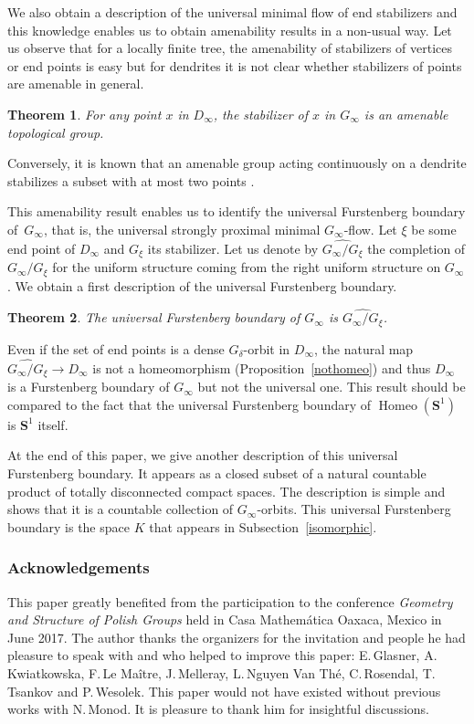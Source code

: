 \documentclass[JEP,XML,SOM,Unicode,NoFloatCountersInSection]{cedram}
\theoremstyle{plain}
\newtheorem{thm}{Theorem}[section]
\theoremstyle{definition}
\newcommand{\bS}{{\boldsymbol{S}}}
\DeclareMathOperator{\Homeo}{Homeo}
\begin{document}
We also obtain a description of the universal minimal flow of end stabilizers and this knowledge enables us to obtain amenability results in a non-usual way. Let us observe that for a locally finite tree, the amenability of stabilizers of vertices or end points is easy but for dendrites it is not clear whether stabilizers of points are amenable in general.

\begin{thm}\label{ufb} For any point $x$ in $D_\infty$, the stabilizer of $x$ in $G_\infty$ is an amenable topological group.\end{thm}

Conversely, it is known that an amenable group acting continuously on a dendrite stabilizes a subset with at most two points \cite{ShiYe2016}.

This amenability result enables us to identify the universal Furstenberg boundary of~$G_\infty$, that is, the universal strongly proximal minimal $G_\infty$-flow. Let $\xi$ be some end point of $D_\infty$ and $G_\xi$ its stabilizer. Let us denote by $\widehat{G_\infty/G_\xi}$ the completion of $G_\infty/G_\xi$ for the uniform structure coming from the right uniform structure on $G_\infty$. We obtain a first description of the universal Furstenberg boundary.

\begin{thm}\label{ufba} The universal Furstenberg boundary of $G_\infty$ is $\widehat{G_\infty/G_\xi}$.
\end{thm}

Even if the set of end points is a dense $G_\delta$-orbit in $D_\infty$, the natural map $\widehat{G_\infty/G_\xi}\to D_\infty$ is not a homeomorphism (Proposition~\ref{nothomeo}) and thus $D_\infty$ is a Furstenberg boundary of $G_\infty$ but not the universal one. This result should be compared to the fact that the universal Furstenberg boundary of $\Homeo(\bS^1)$ is $\bS^1$ itself.

At the end of this paper, we give another description of this universal Furstenberg boundary. It appears as a closed subset of a natural countable product of totally disconnected compact spaces. The description is simple and shows that it is a countable collection of $G_\infty$-orbits. This universal Furstenberg boundary is the space $K$ that appears in Subsection~\ref{isomorphic}.

\subsubsection*{Acknowledgements}
This paper greatly benefited from the participation to the conference \textit{Geometry and Structure of Polish Groups} held in Casa Mathemática Oaxaca, Mexico in June 2017. The author thanks the organizers for the invitation and people he had pleasure to speak with and who helped to improve this paper: E.\,Glasner, A.\,Kwiatkowska, F.\,Le Maître, J.\,Melleray, L.\,Nguyen Van Thé, C.\,Rosendal, T.\,Tsankov and P.\,Wesolek. This paper would not have existed without previous works with N.\,Monod. It is pleasure to thank him for insightful discussions.
\end{document}
